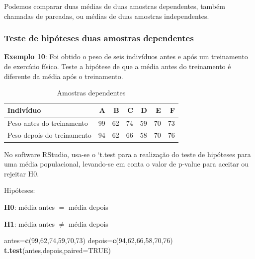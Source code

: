 \documentclass[12pt,brazil,oneside]{book}
\newenvironment{Shaded}{\begin{snugshade}}{\end{snugshade}}
\newcommand{\DataTypeTok}[1]{\textcolor[rgb]{0.13,0.29,0.53}{#1}}
\newcommand{\DecValTok}[1]{\textcolor[rgb]{0.00,0.00,0.81}{#1}}
\newcommand{\KeywordTok}[1]{\textcolor[rgb]{0.13,0.29,0.53}{\textbf{#1}}}
\newcommand{\NormalTok}[1]{#1}
\newcommand{\OtherTok}[1]{\textcolor[rgb]{0.56,0.35,0.01}{#1}}
\begin{document}
Podemos comparar duas médias de duas amostras dependentes, também
chamadas de pareadas, ou médias de duas amostras independentes.

\hypertarget{teste-de-hipoteses-duas-amostras-dependentes}{%
\subsubsection{Teste de hipóteses duas amostras
dependentes}\label{teste-de-hipoteses-duas-amostras-dependentes}}

\textbf{Exemplo 10}: Foi obtido o peso de seis indivíduos antes e após
um treinamento de exercício físico. Teste a hipótese de que a média
antes do treinamento é diferente da média após o treinamento.

\begin{table}

\caption{\label{tab:unnamed-chunk-108}Amostras dependentes}
\centering
\begin{tabular}[t]{l|r|r|r|r|r|r}
\hline
Indivíduo & A & B & C & D & E & F\\
\hline
Peso antes do treinamento & 99 & 62 & 74 & 59 & 70 & 73\\
\hline
Peso depois do treinamento & 94 & 62 & 66 & 58 & 70 & 76\\
\hline
\end{tabular}
\end{table}

No software RStudio, usa-se o `t.test\textbar{} para a realização do
teste de hipóteses para uma média populacional, levando-se em conta o
valor de p-value para aceitar ou rejeitar H0.

Hipóteses:

\textbf{H0}: média antes \(=\) média depois

\textbf{H1}: média antes \(\neq\) média depois

\begin{Shaded}
\begin{Highlighting}[]
\NormalTok{antes=}\KeywordTok{c}\NormalTok{(}\DecValTok{99}\NormalTok{,}\DecValTok{62}\NormalTok{,}\DecValTok{74}\NormalTok{,}\DecValTok{59}\NormalTok{,}\DecValTok{70}\NormalTok{,}\DecValTok{73}\NormalTok{)}
\NormalTok{depois=}\KeywordTok{c}\NormalTok{(}\DecValTok{94}\NormalTok{,}\DecValTok{62}\NormalTok{,}\DecValTok{66}\NormalTok{,}\DecValTok{58}\NormalTok{,}\DecValTok{70}\NormalTok{,}\DecValTok{76}\NormalTok{)}
\KeywordTok{t.test}\NormalTok{(antes,depois,}\DataTypeTok{paired=}\OtherTok{TRUE}\NormalTok{)}
\end{Highlighting}
\end{Shaded}
\end{document}
